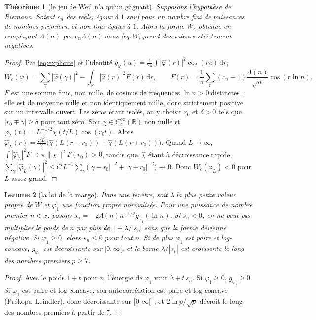 \documentclass[11pt,a4paper]{article}
\newtheorem{theoreme}{Théorème}
\newtheorem{lemme}[theoreme]{Lemme}
\theoremstyle{definition}
\theoremstyle{remark}
\newcommand{\R}{\mathbb{R}}
\newcommand{\dd}{\mathrm{d}}
\begin{document}
\begin{theoreme}[le jeu de Weil n'a qu'un gagnant]\label{th:jeu}
Supposons l'hypothèse de Riemann. Soient $c_n$ des réels, égaux à $1$ sauf pour un nombre fini de puissances de nombres
premiers, et non tous égaux à $1$. Alors la forme $W_c$ obtenue en remplaçant $\Lambda(n)$ par $c_n\Lambda(n)$ dans
\eqref{eq:W} prend des valeurs strictement négatives.
\end{theoreme}
\begin{proof}
Par \eqref{eq:explicite} et l'identité $g_\varphi(u)=\frac1{2\pi}\int|\widehat\varphi(r)|^2\cos(ru)\,\dd r$,
\[
W_c(\varphi)=\sum_\gamma|\widehat\varphi(\gamma)|^2-\int_{\R}|\widehat\varphi(r)|^2F(r)\,\dd r,\qquad
F(r)=\frac1\pi\sum_n(c_n-1)\frac{\Lambda(n)}{\sqrt n}\cos(r\ln n).
\]
$F$ est une somme finie, non nulle, de cosinus de fréquences $\ln n>0$ distinctes~: elle est de moyenne nulle et non
identiquement nulle, donc strictement positive sur un intervalle ouvert. Les zéros étant isolés, on y choisit $r_0$ et
$\delta>0$ tels que $|r_0\mp\gamma|\ge\delta$ pour tout zéro. Soit $\chi\in C_c^\infty(\R)$ non nulle et
$\varphi_L(t)=L^{-1/2}\chi(t/L)\cos(r_0t)$. Alors
$\widehat\varphi_L(r)=\tfrac{\sqrt L}2\bigl(\widehat\chi(L(r-r_0))+\widehat\chi(L(r+r_0))\bigr)$. Quand $L\to\infty$,
$\int|\widehat\varphi_L|^2F\to\pi\|\chi\|^2F(r_0)>0$, tandis que, $\widehat\chi$ étant à décroissance rapide,
$\sum_\gamma|\widehat\varphi_L(\gamma)|^2\le C\,L^{-1}\sum_\gamma\bigl(|\gamma-r_0|^{-2}+|\gamma+r_0|^{-2}\bigr)\to0$.
Donc $W_c(\varphi_L)<0$ pour $L$ assez grand.
\end{proof}

\begin{lemme}[la loi de la marge]\label{lem:marge}
Dans une fenêtre, soit $\lambda$ la plus petite valeur propre de $W$ et $\varphi_1$ une fonction propre normalisée.
Pour une puissance de nombre premier $n<x$, posons $s_n=-2\Lambda(n)n^{-1/2}g_{\varphi_1}(\ln n)$. Si $s_n<0$, on ne peut pas
multiplier le poids de $n$ par plus de $1+\lambda/|s_n|$ sans que la forme devienne négative. Si $\varphi_1\ge0$, alors
$s_n\le0$ pour tout $n$. Si de plus $\varphi_1$ est paire et log-concave, $g_{\varphi_1}$ est décroissante sur $[0,\infty[$, et
la borne $\lambda/|s_p|$ est croissante le long des nombres premiers $p\ge7$.
\end{lemme}
\begin{proof}
Avec le poids $1+t$ pour $n$, l'énergie de $\varphi_1$ vaut $\lambda+t\,s_n$. Si $\varphi_1\ge0$, $g_{\varphi_1}\ge0$. Si
$\varphi_1$ est paire et log-concave, son autocorrélation est paire et log-concave (Prékopa--Leindler), donc décroissante sur
$[0,\infty[$~; et $2\ln p/\sqrt p$ décroît le long des nombres premiers à partir de $7$.
\end{proof}
\end{document}
